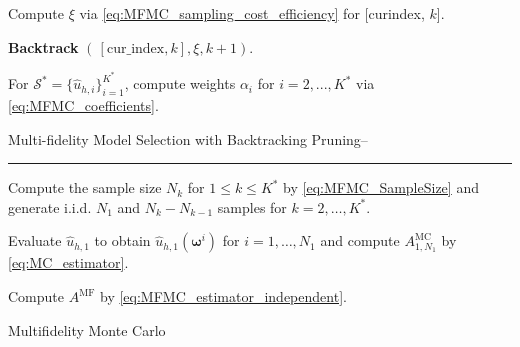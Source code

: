 \begin{algorithm}[!ht]
{{{        Compute $\xi$ via \eqref{eq:MFMC_sampling_cost_efficiency} for  
      [cur\textunderscore index, $k$].

      
      \textbf{Backtrack} $(\, [\text{cur}\_\text{index},k],\xi, k+1)$.
  }
}
}
\vspace{3mm}



For $\mathcal{S}^*=\{\widehat u_{h,i}\}_{i=1}^{K^*}$, compute weights $\alpha_i$ for $i=2,...,K^*$ via \eqref{eq:MFMC_coefficients}. 

\caption{Multi-fidelity Model Selection with Backtracking Pruning--}
\end{algorithm}
\ULforem




\normalem
\begin{algorithm}[!ht]
\label{algo:MFMC_Algo}
\DontPrintSemicolon

    
   \vspace{1ex}
    
    \vspace{1ex}
    \hrule \vspace{1ex}
    

    Compute the sample size $N_k$ for $1\leq k\leq K^*$ by \eqref{eq:MFMC_SampleSize} and generate i.i.d. $N_1$ and $N_k-N_{k-1}$ samples for $k=2,\ldots, K^*$.

    Evaluate $\widehat u_{h, 1}$ to obtain $\widehat u_{h, 1}(\boldsymbol{\omega}^i)$ for $i = 1,\ldots,N_1$ and compute $A_{1,N_1}^{\text{MC}}$ by \eqref{eq:MC_estimator}.
    

    Compute $A^{\text{MF}}$ by \eqref{eq:MFMC_estimator_independent}.
    
\caption{Multifidelity Monte Carlo}
\end{algorithm}
\ULforem

